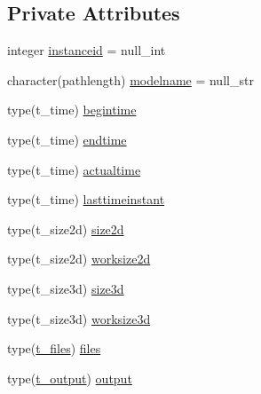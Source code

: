 \subsection*{Private Attributes}
\begin{DoxyCompactItemize}
\item 
integer \mbox{\hyperlink{structmoduleinterfacewaterair_1_1t__interfacewaterair_a2cd9e17c290a1b4be4364da5f49e8771}{instanceid}} = null\+\_\+int
\item 
character(pathlength) \mbox{\hyperlink{structmoduleinterfacewaterair_1_1t__interfacewaterair_a9f877b64f327c7f367746bd82e8624af}{modelname}} = null\+\_\+str
\item 
type(t\+\_\+time) \mbox{\hyperlink{structmoduleinterfacewaterair_1_1t__interfacewaterair_ab099f67cbdf292a1261b953d6e08f6c2}{begintime}}
\item 
type(t\+\_\+time) \mbox{\hyperlink{structmoduleinterfacewaterair_1_1t__interfacewaterair_a04203ce2f53b03b8f95950299a3adde4}{endtime}}
\item 
type(t\+\_\+time) \mbox{\hyperlink{structmoduleinterfacewaterair_1_1t__interfacewaterair_a18503a941fceaf3752c78bce44a9fd5c}{actualtime}}
\item 
type(t\+\_\+time) \mbox{\hyperlink{structmoduleinterfacewaterair_1_1t__interfacewaterair_a158f880cf4ed803902c5045aba3b19b4}{lasttimeinstant}}
\item 
type(t\+\_\+size2d) \mbox{\hyperlink{structmoduleinterfacewaterair_1_1t__interfacewaterair_af10730be71cb2980b2992854788df2e2}{size2d}}
\item 
type(t\+\_\+size2d) \mbox{\hyperlink{structmoduleinterfacewaterair_1_1t__interfacewaterair_a27d573de29e9c409cf7e87df81a7a3a8}{worksize2d}}
\item 
type(t\+\_\+size3d) \mbox{\hyperlink{structmoduleinterfacewaterair_1_1t__interfacewaterair_aa0b50911262f4de99ad57ed34deddd8b}{size3d}}
\item 
type(t\+\_\+size3d) \mbox{\hyperlink{structmoduleinterfacewaterair_1_1t__interfacewaterair_a00afa83ce20dbb4efa3c061989c3094c}{worksize3d}}
\item 
type(\mbox{\hyperlink{structmoduleinterfacewaterair_1_1t__files}{t\+\_\+files}}) \mbox{\hyperlink{structmoduleinterfacewaterair_1_1t__interfacewaterair_a7897eb0ef6bf9c01573a4f33051e38d5}{files}}
\item 
type(\mbox{\hyperlink{structmoduleinterfacewaterair_1_1t__output}{t\+\_\+output}}) \mbox{\hyperlink{structmoduleinterfacewaterair_1_1t__interfacewaterair_ae3e7e538068c5c983cb5971cfdc3c3f1}{output}}

\end{DoxyCompactItemize}
